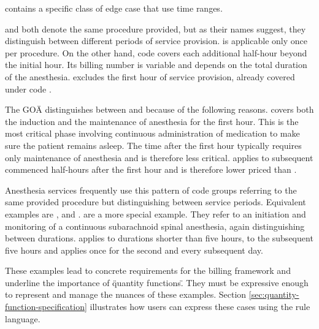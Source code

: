  contains a specific class of edge case that use time ranges.

 and 
both denote the same procedure provided, but as their names suggest, they distinguish between different periods of service provision.
 is applicable only once per procedure.
On the other hand, code  covers each additional half-hour beyond the initial hour.
Its billing number is variable and depends on the total duration of the anesthesia.
 excludes the first hour of service provision, already covered under code .

The GOÄ distinguishes between  and  because of the following reasons.
 covers both the induction and the maintenance of anesthesia for the first hour.
This is the most critical phase involving continuous administration of medication to make sure the patient remains asleep.
The time after the first hour typically requires only maintenance of anesthesia and is therefore less critical.
 applies to subsequent commenced half-hours after the first hour and is therefore lower priced than .


Anesthesia services frequently use this pattern of code groups referring to the same provided procedure but distinguishing between service periods.
Equivalent examples are ,  and .
 are a more special example.
They refer to an initiation and monitoring of a continuous subarachnoid spinal anesthesia, again distinguishing between durations.
 applies to durations shorter than five hours,  to the subsequent five hours and  applies once for the second and every subsequent day.

These examples lead to concrete requirements for the billing framework and underline the importance of \"quantity functions\".
They must be expressive enough to represent and manage the nuances of these examples.
Section \ref{sec:quantity-function-specification} illustrates how users can express these cases using the rule language.
